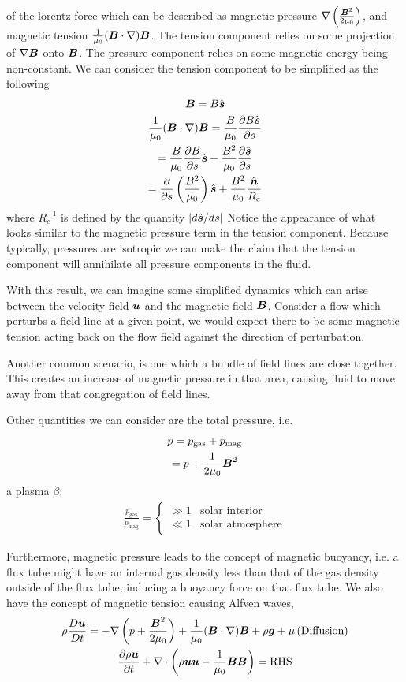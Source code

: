 \documentclass{article}
\begin{document}
of the lorentz force which can be described as magnetic pressure
$\nabla\left(\frac{\boldsymbol{B}^2}{2\mu_0}\right)$, and magnetic tension
$\frac{1}{\mu_0}(\boldsymbol{B}\cdot\nabla)\boldsymbol{B}$. The tension component relies on some
projection of $\nabla\boldsymbol{B}$ onto $\boldsymbol{B}$. The pressure component relies on some
magnetic energy being non-constant. We can consider the tension component to be
simplified as the following
\begin{gather*}
    \boldsymbol{B} = B\hat{\boldsymbol{s}}\\
    \frac{1}{\mu_0}(\boldsymbol{B}\cdot\nabla)\boldsymbol{B} = \frac{B}{\mu_0}\frac{\partial B\hat{\boldsymbol{s}}}{\partial s}\\
    =\frac{B}{\mu_0}\frac{\partial B}{\partial s}\hat{\boldsymbol{s}} +
    \frac{B^2}{\mu_0}\frac{\partial \hat{\boldsymbol{s}}}{\partial s}\\
     = \frac{\partial }{\partial s} \left(\frac{B^2}{\mu_0}\right) \hat{\boldsymbol{s}} +
     \frac{B^2}{\mu_0}\frac{\hat{\boldsymbol{n}}}{R_c}
\end{gather*}
where $R_c^{-1}$ is defined by the quantity $\left|d\hat{\boldsymbol{s}}/ds\right|$
Notice the appearance of what looks similar to the magnetic pressure term in the
tension component. Because typically, pressures are isotropic we can make the
claim that the tension component will annihilate all pressure components in the
fluid.

With this result, we can imagine some simplified dynamics which can arise
between the velocity field $\boldsymbol{u}$ and the magnetic field $\boldsymbol{B}$. Consider a flow
which perturbs a field line at a given point, we would expect there to be some
magnetic tension acting back on the flow field against the direction of
perturbation. 

Another common scenario, is one which a bundle of field lines are close
together. This creates an increase of magnetic pressure in that area, causing
fluid to move away from that congregation of field lines. 

Other quantities we can consider are the total pressure, i.e.
\begin{gather*}
    p = p_{\text{gas}} + p_{\text{mag}} \\
    = p + \frac{1}{2\mu_0}\boldsymbol{B}^2
\end{gather*}
a plasma $\beta$:
\begin{gather*}
    \frac{p_{\text{gas}}}{p_{\text{mag}}} = \begin{cases}
    \gg 1 & \text{solar interior}\\
    \ll 1 & \text{solar atmosphere}\end{cases}
\end{gather*}

Furthermore, magnetic pressure leads to the concept of magnetic buoyancy, i.e. a
flux tube might have an internal gas density less than that of the gas density
outside of the flux tube, inducing a buoyancy force on that flux tube. We also
have the concept of magnetic tension causing Alfven waves, 
\begin{gather*}
    \rho\frac{D \boldsymbol{u}}{D t} = -\nabla\left(p + \frac{\boldsymbol{B}^2}{2\mu_0}\right) +
    \frac{1}{\mu_0}(\boldsymbol{B}\cdot\nabla)\boldsymbol{B} + \rho\boldsymbol{g} +
    \mu\left(\text{Diffusion}\right)\\
    \frac{\partial \rho\boldsymbol{u}}{\partial t} + \nabla \cdot\left(\rho\boldsymbol{u}\boldsymbol{u} - \frac{1}{\mu_0}\boldsymbol{B}\boldsymbol{B}\right) = \text{RHS}
\end{gather*}
\end{document}
